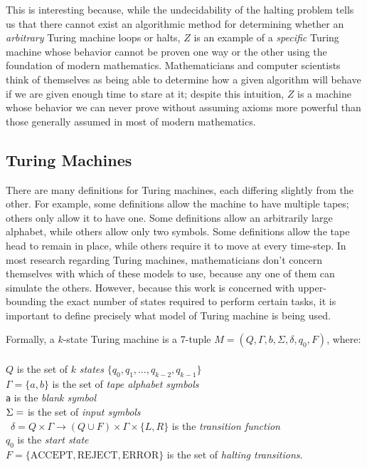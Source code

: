 \documentclass[11pt]{article}
\begin{document}
This is interesting because, while the undecidability of the halting problem tells us that there cannot exist an algorithmic method for determining whether an \emph{arbitrary} Turing machine loops or halts, $Z$ is an example of a \emph{specific} Turing machine whose behavior cannot be proven one way or the other using the foundation of modern mathematics. Mathematicians and computer scientists think of themselves as being able to determine how a given algorithm will behave if we are given enough time to stare at it; despite this intuition, $Z$ is a machine whose behavior we can never prove without assuming axioms more powerful than those generally assumed in most of modern mathematics. 

\subsection{Turing Machines \label{sec:tm}}

There are many definitions for Turing machines, each differing slightly from the other. For example, some definitions allow the machine to have multiple tapes; others only allow it to have one. Some definitions allow an arbitrarily large alphabet, while others allow only two symbols. Some definitions allow the tape head to remain in place, while others require it to move at every time-step. In most research regarding Turing machines, mathematicians don't concern themselves with which of these models to use, because any one of them can simulate the others. However, because this work is concerned with upper-bounding the exact number of states required to perform certain tasks, it is important to define precisely what model of Turing machine is being used. 

Formally, a $k$-state Turing machine is a 7-tuple $M = (Q, \Gamma, b, \Sigma, \delta, q_0, F)$, where: \\ \\
$Q$ is the set of $k$ \emph{states} $\{q_0, q_1, \dots, q_{k-2}, q_{k-1}\}$ \\
$\Gamma = \{a, b\}$ is the set of \emph{tape alphabet symbols} \\
\texttt{a} is the \emph{blank symbol} \\
$\Sigma = \empty$ is the set of \emph{input symbols} \\\
$\delta = Q \times \Gamma \rightarrow (Q \cup F) \times \Gamma \times \{L, R\}$ is the \emph{transition function} \\
$q_0$ is the \emph{start state} \\
$F = \{\textrm{ACCEPT}, \textrm{REJECT}, \textrm{ERROR}\}$ is the set of \emph{halting transitions}. \\
\end{document}
